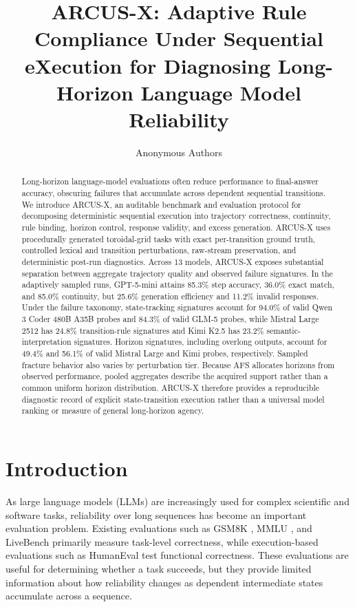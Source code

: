 \documentclass{article}
\title{ARCUS-X: Adaptive Rule Compliance Under Sequential eXecution for Diagnosing Long-Horizon Language Model Reliability}
\author{Anonymous Authors}
\begin{document}
\maketitle

\begin{abstract}
Long-horizon language-model evaluations often reduce performance to final-answer accuracy, obscuring failures that accumulate across dependent sequential transitions. We introduce ARCUS-X, an auditable benchmark and evaluation protocol for decomposing deterministic sequential execution into trajectory correctness, continuity, rule binding, horizon control, response validity, and excess generation. ARCUS-X uses procedurally generated toroidal-grid tasks with exact per-transition ground truth, controlled lexical and transition perturbations, raw-stream preservation, and deterministic post-run diagnostics. Across 13 models, ARCUS-X exposes substantial separation between aggregate trajectory quality and observed failure signatures. In the adaptively sampled runs, GPT-5-mini attains 85.3\% step accuracy, 36.0\% exact match, and 85.0\% continuity, but 25.6\% generation efficiency and 11.2\% invalid responses. Under the failure taxonomy, state-tracking signatures account for 94.0\% of valid Qwen 3 Coder 480B A35B probes and 84.3\% of valid GLM-5 probes, while Mistral Large 2512 has 24.8\% transition-rule signatures and Kimi K2.5 has 23.2\% semantic-interpretation signatures. Horizon signatures, including overlong outputs, account for 49.4\% and 56.1\% of valid Mistral Large and Kimi probes, respectively. Sampled fracture behavior also varies by perturbation tier. Because AFS allocates horizons from observed performance, pooled aggregates describe the acquired support rather than a common uniform horizon distribution. ARCUS-X therefore provides a reproducible diagnostic record of explicit state-transition execution rather than a universal model ranking or measure of general long-horizon agency.

\end{abstract}

\section{Introduction}

As large language models (LLMs) are increasingly used for complex scientific and software tasks, reliability over long sequences has become an important evaluation problem. Existing evaluations such as GSM8K \cite{cobbe2021gsm8k}, MMLU \cite{hendrycks2020mmlu}, and LiveBench \cite{gu2024livebench} primarily measure task-level correctness, while execution-based evaluations such as HumanEval \cite{chen2021evaluating} test functional correctness. These evaluations are useful for determining whether a task succeeds, but they provide limited information about how reliability changes as dependent intermediate states accumulate across a sequence.
\end{document}
